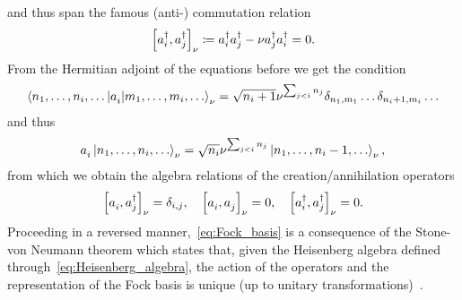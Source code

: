 and thus span the famous (anti-) commutation relation
\begin{align}
    \left[ a^\dag_i, a^\dag_j \right]_\nu \coloneqq a^\dag_i a^\dag_j - \nu a^\dag_j a^\dag_i = 0.
\end{align}
From the Hermitian adjoint of the equations before we get the condition
\begin{align}
   \braket{n_1,\dots,n_i,\dots | a^\pdag_i | m_1, \dots, m_i,\dots}_\nu =
   \sqrt{n_i+1}\nu^{\sum_{j<i}n_j} \delta_{n_1,m_1}\dots\delta_{n_i+1,m_i}\dots
\end{align}
and thus
\begin{align}
   a^\pdag_i \ket{n_1, \dots, n_i,\dots}_\nu =
   \sqrt{n_i}\nu^{\sum_{j<i}n_j} \ket{n_1, \dots, n_i-1,\dots}_\nu,
   \label{eq:annihilation}
\end{align}
from which we obtain the algebra relations of the creation/annihilation operators
\begin{align}
    \commutator{a^\pdag_i,a^\dag_j}_\nu = \delta_{i,j},
    \quad
    \commutator{a^\pdag_i,a^\pdag_j}_\nu = 0,
    \quad
    \commutator{a^\dag_i,a^\dag_j}_\nu = 0.
    \label{eq:Heisenberg_algebra}
\end{align}
Proceeding in a reversed manner,~\cref{eq:Fock_basis} is a consequence of the Stone-von Neumann theorem which states that, given the Heisenberg algebra defined through~\cref{eq:Heisenberg_algebra}, the action of the operators and the representation of the Fock basis is unique (up to unitary transformations)~\cite{Hall2013}.

